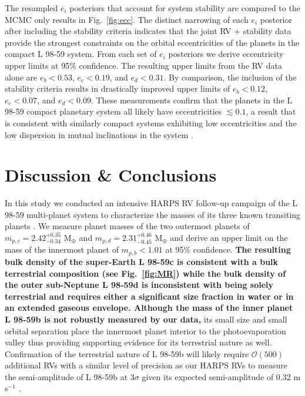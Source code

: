 \documentclass[longauth]{aa}
\newcommand{\mps}{m s$^{-1}$}
\begin{document}
The resampled $e_i$ posteriors that account for system stability are compared to the MCMC only results in Fig.~\ref{fig:ecc}. The distinct narrowing of each $e_i$ posterior after including the stability criteria indicates that the joint RV $+$ stability data provide the strongest constraints on the orbital eccentricities of the planets in the compact L 98-59 system. From each set of $e_i$ posteriors we derive eccentricity upper limits at 95\% confidence. The resulting upper limits from the RV data alone are $e_b < 0.53$, $e_c<0.19$, and $e_d < 0.31$. By comparison, the inclusion of the stability criteria results in drastically improved upper limits of $e_b < 0.12$, $e_c<0.07$, and $e_d < 0.09$. These measurements confirm that the planets in the L 98-59 compact planetary system all likely have eccentricities $\lesssim 0.1$, a result that is consistent with similarly compact systems exhibiting low eccentricities \citep{hadden14,vaneylen15} and the low dispersion in mutual inclinations in the system .

\section{Discussion \& Conclusions}
\label{sec:conclusion}
In this study we conducted an intensive HARPS RV follow-up campaign of the L 98-59 multi-planet system to characterize the masses of its three known transiting planets . We measure planet masses of the two outermost planets of $m_{p,c}=2.42^{+0.35}_{-0.34}$ M$_{\oplus}$ and $m_{p,d}=2.31^{+0.46}_{-0.45}$ M$_{\oplus}$ and derive an upper limit on the mass of the innermost planet of $m_{p,b}<1.01$ at 95\% confidence. \textbf{The resulting bulk density of the super-Earth L 98-59c is consistent with a bulk terrestrial composition (see Fig.~\ref{fig:MR}) while the bulk density of the outer sub-Neptune L 98-59d is inconsistent with being solely terrestrial and requires either a significant size fraction in water or in an extended gaseous envelope. Although the mass of the inner planet L 98-59b is not robustly measured by our data,} its small size and small orbital separation place the innermost planet interior to the photoevaporation valley \citep{owen13,jin14,lopez14,chen16,lopez16,owen17} thus providing supporting evidence for its terrestrial nature as well. Confirmation of the terrestrial nature of L 98-59b will likely require $\mathcal{O}(500)$ additional RVs with a similar level of precision as our HARPS RVs to measure the semi-amplitude of L 98-59b at $3\sigma$ \citep{cloutier18b} given its expected semi-amplitude of 0.32 \mps{} \citep{chen17}. 
\end{document}
